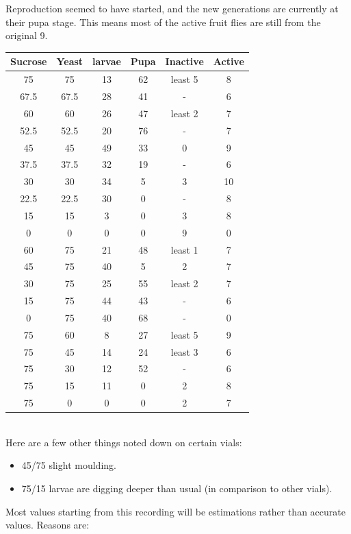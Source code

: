 \documentclass{article}
\begin{document}
Reproduction seemed to have started, and the new generations are currently at their pupa stage. This means most of the active fruit flies are still from the original 9.\\

{
\centering
\begin{tabular}{|c|c|c|c|c|c|}
  \hline
  Sucrose & Yeast & larvae & Pupa & Inactive & Active\\
  \hline
  \hline
  75 & 75 & 13 & 62 & least 5 & 8\\
  67.5 & 67.5 & 28 & 41 & - & 6\\
  60 & 60 & 26 & 47 & least 2 & 7\\
  52.5 & 52.5 & 20 & 76 & - & 7\\
  45 & 45 & 49 & 33 & 0 & 9\\
  37.5 & 37.5 & 32 & 19 & - & 6\\
  30 & 30 & 34 & 5 & 3 & 10\\
  22.5 & 22.5 & 30 & 0 & - & 8\\
  15 & 15 & 3 & 0 & 3 & 8\\
  0 & 0 & 0 & 0 & 9 & 0\\
  \hline
  60 & 75 & 21 & 48 & least 1 & 7\\
  45 & 75 & 40 & 5 & 2 & 7\\
  30 & 75 & 25 & 55 & least 2 & 7\\
  15 & 75 & 44 & 43 & - & 6\\
  0 & 75 & 40 & 68 & - & 0\\
  \hline
  75 & 60 & 8 & 27 & least 5 & 9\\
  75 & 45 & 14 & 24 & least 3 & 6\\
  75 & 30 & 12 & 52 & - & 6\\
  75 & 15 & 11 & 0 & 2 & 8\\
  75 & 0 & 0 & 0 & 2 & 7\\
  \hline
\end{tabular}
\par
}

\noindent\\
Here are a few other things noted down on certain vials:

\begin{itemize}
  \item 45/75 slight moulding.
  \item 75/15 larvae are digging deeper than usual (in comparison to other vials).
\end{itemize}
\newpage
\noindent
Most values starting from this recording will be estimations rather than accurate values. Reasons are:
\end{document}
